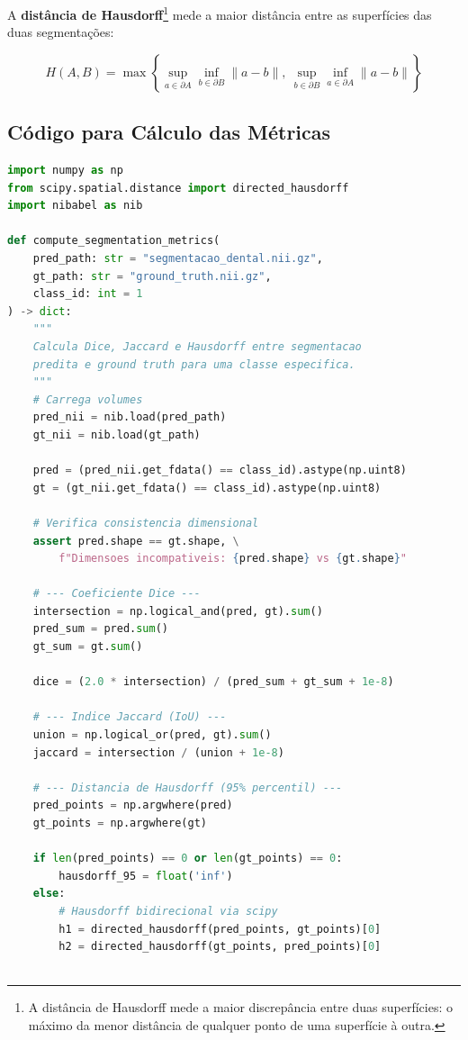 A \textbf{distância de Hausdorff}\footnote{A distância de Hausdorff
mede a maior discrepância entre duas superfícies: o máximo da menor
distância de qualquer ponto de uma superfície à outra.} mede a
maior distância entre as superfícies das duas segmentações:

\begin{equation}
H(A,B) = \max\left\{\sup_{a \in \partial A} \inf_{b \in \partial B}
\|a-b\|,\ \sup_{b \in \partial B} \inf_{a \in \partial A}
\|a-b\|\right\}
\label{eq:hausdorff}
\end{equation}

\subsection{Código para Cálculo das Métricas}

\begin{lstlisting}[language=Python, caption={Cálculo de métricas de validação entre segmentações}, label={lst:metrics}]
import numpy as np
from scipy.spatial.distance import directed_hausdorff
import nibabel as nib

def compute_segmentation_metrics(
    pred_path: str = "segmentacao_dental.nii.gz",
    gt_path: str = "ground_truth.nii.gz",
    class_id: int = 1
) -> dict:
    """
    Calcula Dice, Jaccard e Hausdorff entre segmentacao
    predita e ground truth para uma classe especifica.
    """
    # Carrega volumes
    pred_nii = nib.load(pred_path)
    gt_nii = nib.load(gt_path)
    
    pred = (pred_nii.get_fdata() == class_id).astype(np.uint8)
    gt = (gt_nii.get_fdata() == class_id).astype(np.uint8)
    
    # Verifica consistencia dimensional
    assert pred.shape == gt.shape, \
        f"Dimensoes incompativeis: {pred.shape} vs {gt.shape}"
    
    # --- Coeficiente Dice ---
    intersection = np.logical_and(pred, gt).sum()
    pred_sum = pred.sum()
    gt_sum = gt.sum()
    
    dice = (2.0 * intersection) / (pred_sum + gt_sum + 1e-8)
    
    # --- Indice Jaccard (IoU) ---
    union = np.logical_or(pred, gt).sum()
    jaccard = intersection / (union + 1e-8)
    
    # --- Distancia de Hausdorff (95% percentil) ---
    pred_points = np.argwhere(pred)
    gt_points = np.argwhere(gt)
    
    if len(pred_points) == 0 or len(gt_points) == 0:
        hausdorff_95 = float('inf')
    else:
        # Hausdorff bidirecional via scipy
        h1 = directed_hausdorff(pred_points, gt_points)[0]
        h2 = directed_hausdorff(gt_points, pred_points)[0]
        

\end{lstlisting}
